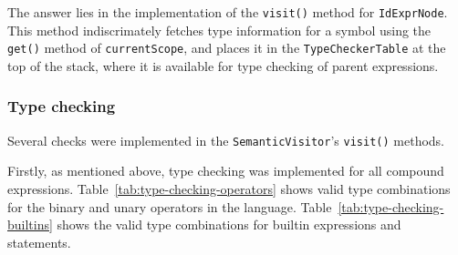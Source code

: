 \documentclass[11pt,a4paper]{scrartcl}
\begin{document}
The answer lies in the implementation of the \verb|visit()| method for \verb|IdExprNode|. This method indiscrimately fetches type information for a symbol using the \verb|get()| method of \verb|currentScope|, and places it in the \verb|TypeCheckerTable| at the top of the stack, where it is available for type checking of parent expressions.

\subsubsection{Type checking}

Several checks were implemented in the \verb|SemanticVisitor|'s \verb|visit()| methods.

Firstly, as mentioned above, type checking was implemented for all compound expressions. Table~\ref{tab:type-checking-operators} shows valid type combinations for the binary and unary operators in the language. Table~\ref{tab:type-checking-builtins} shows the valid type combinations for builtin expressions and statements.
\end{document}
